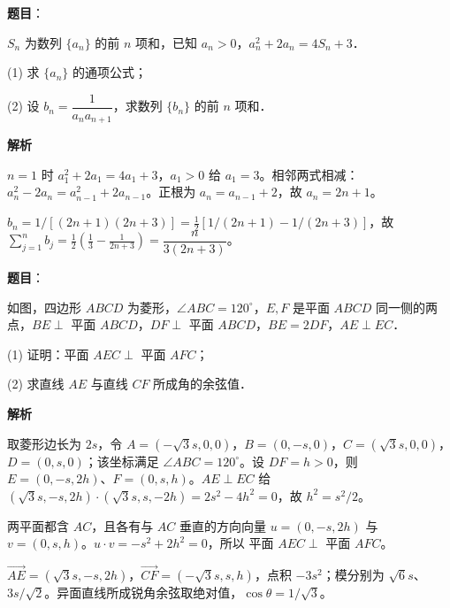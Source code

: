 \begin{answer}

\textbf{题目}：

$S_n$ 为数列 $\{a_n\}$ 的前 $n$ 项和，已知 $a_n>0$，$a_n^2+2a_n=4S_n+3$．

(1) 求 $\{a_n\}$ 的通项公式；

(2) 设 $b_n=\dfrac1{a_na_{n+1}}$，求数列 $\{b_n\}$ 的前 $n$ 项和．

\textbf{解析}


$n=1$ 时 $a_1^2+2a_1=4a_1+3$，$a_1>0$ 给 $a_1=3$。相邻两式相减：$a_n^2-2a_n=a_{n-1}^2+2a_{n-1}$。正根为 $a_n=a_{n-1}+2$，故 $a_n=2n+1$。


$b_n=1/[(2n+1)(2n+3)]=\tfrac12[1/(2n+1)-1/(2n+3)]$，故 $\sum_{j=1}^{n}b_j=\tfrac12(\tfrac13-\tfrac1{2n+3})=\dfrac{n}{3(2n+3)}$。



\end{answer}
\begin{answer}

\textbf{题目}：

如图，四边形 $ABCD$ 为菱形，$\angle ABC=120^\circ$，$E,F$ 是平面 $ABCD$ 同一侧的两点，$BE\perp$ 平面 $ABCD$，$DF\perp$ 平面 $ABCD$，$BE=2DF$，$AE\perp EC$．
\nopagebreak[4]
\begin{center}\end{center}
\nopagebreak[4]
(1) 证明：平面 $AEC\perp$ 平面 $AFC$；

(2) 求直线 $AE$ 与直线 $CF$ 所成角的余弦值．

\textbf{解析}

取菱形边长为 $2s$，令 $A=(-\sqrt3s,0,0)$，$B=(0,-s,0)$，$C=(\sqrt3s,0,0)$，$D=(0,s,0)$；该坐标满足 $\angle ABC=120^\circ$。设 $DF=h>0$，则 $E=(0,-s,2h)$、$F=(0,s,h)$。$AE\perp EC$ 给 $(\sqrt3s,-s,2h)\cdot(\sqrt3s,s,-2h)=2s^2-4h^2=0$，故 $h^2=s^2/2$。


两平面都含 $AC$，且各有与 $AC$ 垂直的方向向量 $u=(0,-s,2h)$ 与 $v=(0,s,h)$。$u\cdot v=-s^2+2h^2=0$，所以 平面 $AEC\perp$ 平面 $AFC$。


$\overrightarrow{AE}=(\sqrt3s,-s,2h)$，$\overrightarrow{CF}=(-\sqrt3s,s,h)$，点积 $-3s^2$；模分别为 $\sqrt6s$、$3s/\sqrt2$。异面直线所成锐角余弦取绝对值，$\cos\theta=1/\sqrt3$。



\end{answer}
